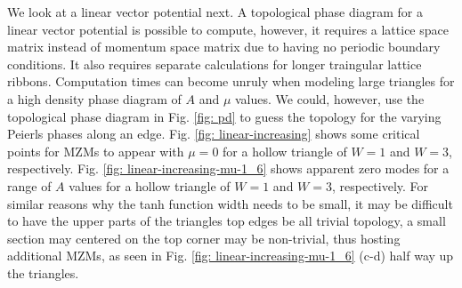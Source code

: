 We look at a linear vector potential next.
A topological phase diagram for a linear vector potential is possible to compute, however, it requires a lattice space matrix instead of momentum space matrix due to having no periodic boundary conditions.
It also requires separate calculations for longer traingular lattice ribbons.
Computation times can become unruly when modeling large triangles for a high density phase diagram of $A$ and $\mu$ values.
We could, however, use the topological phase diagram in Fig. \ref{fig: pd} to guess the topology for the varying Peierls phases along an edge.
Fig. \ref{fig: linear-increasing} shows some critical points for MZMs to appear with $\mu=0$ for a hollow triangle of $W=1$ and $W=3$, respectively.
Fig. \ref{fig: linear-increasing-mu-1_6} shows apparent zero modes for a range of $A$ values for a hollow triangle of $W=1$ and $W=3$, respectively.
For similar reasons why the tanh function width needs to be small, it may be difficult to have the upper parts of the triangles top edges be all trivial topology, a small section may centered on the top corner may be non-trivial, thus hosting additional MZMs, as seen in Fig. \ref{fig: linear-increasing-mu-1_6} (c-d) half way up the triangles.

